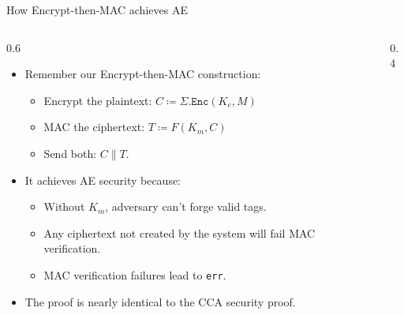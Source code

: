 \ifdefined\PRESENTATION\else\PassOptionsToClass{handout}{beamer}\fi\documentclass[aspectratio=169, lualatex]{beamer}
\begin{document}
\begin{frame}{How Encrypt-then-MAC achieves AE}
	\begin{columns}[c]
		\begin{column}{0.6\textwidth}
			\begin{itemize}[<+->]
				\item Remember our Encrypt-then-MAC construction:
				      \begin{itemize}
					      \item Encrypt the plaintext: $C \coloneq \Sigma.\texttt{Enc}(K_e, M)$
					      \item MAC the ciphertext: $T \coloneq F(K_m, C)$
					      \item Send both: $C\|T$.
				      \end{itemize}
				\item It achieves AE security because:
				      \begin{itemize}
					      \item Without $K_m$, adversary can't forge valid tags.
					      \item Any ciphertext not created by the system will fail MAC verification.
					      \item MAC verification failures lead to \texttt{err}.
				      \end{itemize}
				\item The proof is nearly identical to the CCA security proof.
			\end{itemize}
		\end{column}
		\begin{column}{0.4\textwidth}
			\vspace{0.5em}
		\end{column}
	\end{columns}
\end{frame}
\end{document}
